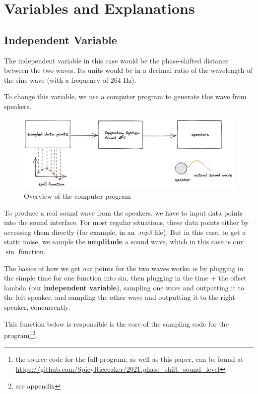 \documentclass[index]{subfiles}
\begin{document}
\section{Variables and Explanations}

\subsection{Independent Variable}

The independent variable in this case would be the phase-shifted distance between the two waves. Its units would be in a decimal ratio of the wavelength of the sine wave (with a frequency of 264 Hz).

To change this variable, we use a computer program to generate this wave from speakers.

\begin{figure}[H]
    \centering
    \includegraphics[scale=0.2]{res/layout.png}
    \caption{Overview of the computer program}
\end{figure}

To produce a real sound wave from the speakers, we have to input data points into the sound interface. For most regular situations, these data points either by accessing them directly (for example, in an \textit{.mp3} file). But in this case, to get a static noise, we sample the \textbf{amplitude} a sound wave, which in this case is our \(\sin\) function.

The basics of how we get our points for the two waves works: is by plugging in the simple time for one function into sin, then plugging in the time + the offset lambda (our \textbf{independent variable}), sampling one wave and outputting it to the left speaker, and sampling the other wave and outputting it to the right speaker, concurrently.

This function below is responsible is the core of the sampling code for the program\footnote[1]{the source code for the full program, as well as this paper, can be found at \href{https://github.com/SpicyRicecaker/2021.phase\_shift\_sound\_level}{https://github.com/SpicyRicecaker/2021.phase\_shift\_sound\_level}}\footnote[2]{see appendix}.
\end{document}
